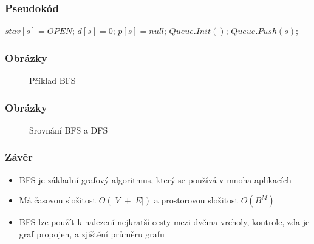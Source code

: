 \documentclass[11pt]{beamer}
\begin{document}
\begin{frame}
    \frametitle{Pseudokód}
    \begin{algorithm}[H]
        \BlankLine
        $stav[s] = OPEN$; $d[s] = 0$; $p[s] = null$; $Queue.Init()$; $Queue.Push(s)$;
        \end{algorithm}
\end{frame}

\begin{frame}
    \frametitle{Obrázky}
    \begin{figure}[ht]
        \begin{center}
            \caption{Příklad BFS}
        \end{center}
    \end{figure}
\end{frame}

\begin{frame}
    \frametitle{Obrázky}
    \begin{figure}[ht]
        \begin{center}
            \caption{Srovnání BFS a DFS}
        \end{center}
    \end{figure}
\end{frame}

\begin{frame}
    \frametitle{Závěr}
    \begin{itemize}
        \item BFS je základní grafový algoritmus, který se používá v mnoha aplikacích
        \item Má časovou složitost $O(|V|+|E|)$ a prostorovou složitost $O(B^M)$
        \item BFS lze použít k nalezení nejkratší cesty mezi dvěma vrcholy, kontrole, zda je graf propojen, a zjištění průměru grafu
    \end{itemize}
\end{frame}
    
\end{document}
